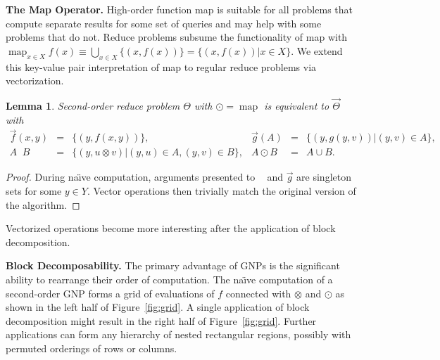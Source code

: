 \documentclass{article}
\newtheorem{lemma}{Lemma}
\DeclareMathOperator*{\map}{map}
\begin{document}

{\bf The Map Operator.}  High-order function map is suitable for all
problems that compute separate results for some set of queries and may
help with some problems that do not.  Reduce problems subsume the
functionality of map with $\map_{x \in X} f(x) \equiv \bigcup_{x \in
X} \{(x,f(x))\} = \{(x,f(x)) | x \in X\}$.  We extend this key-value
pair interpretation of map to regular reduce problems via
vectorization.
\begin{lemma}
  Second-order reduce problem $\Theta$ with $\odot = \map$ is
  equivalent to $\overrightarrow{\Theta}$ with
  \[ \begin{array}{rclrcl}
    \overrightarrow{f}(x,y) & = & \{(y, f(x,y))\}, & \overrightarrow{g}(A) & = & \{(y, g(y,v)) | (y,v) \in A\}, \\
    A \mathop{\overrightarrow{\otimes}}\nolimits B & = & \{(y, u \otimes v) | (y,u) \in A, (y,v) \in B\}, & A \odot B & = & A \cup B.
  \end{array} \]
\end{lemma}
\begin{proof}
  During na\"{\i}ve computation, arguments presented to
  $\mathop{\overrightarrow{\otimes}}\nolimits$ and
  $\overrightarrow{g}$ are singleton sets for some $y \in Y$.  Vector
  operations then trivially match the original version of the
  algorithm.
\end{proof}
\noindent Vectorized operations become more interesting after the
application of block decomposition.


{\bf Block Decomposability.} The primary advantage of GNPs is the
significant ability to rearrange their order of computation.  The
na\"{\i}ve computation of a second-order GNP forms a grid of
evaluations of $f$ connected with $\otimes$ and $\odot$ as shown in
the left half of Figure~\ref{fig:grid}.  A single application of block
decomposition might result in the right half of Figure~\ref{fig:grid}.
Further applications can form any hierarchy of nested rectangular
regions, possibly with permuted orderings of rows or columns.
\end{document}
